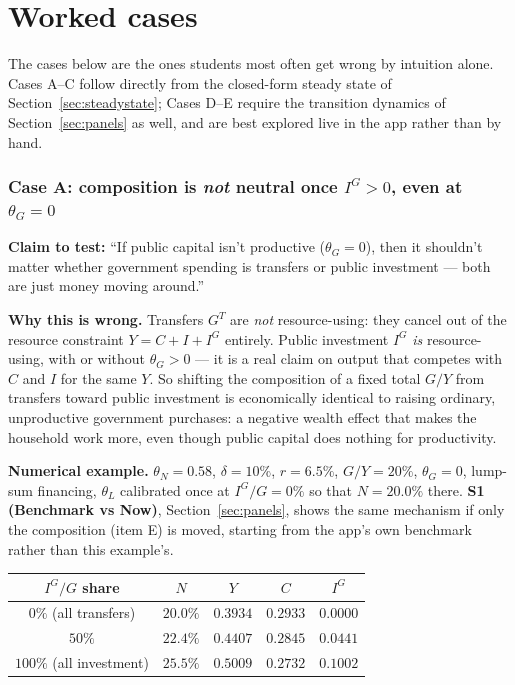 \documentclass[11pt]{article}
\begin{document}
\part{Worked cases}

The cases below are the ones students most often get wrong by intuition
alone. Cases A--C follow directly from the closed-form steady state of
Section~\ref{sec:steadystate}; Cases D--E require the transition dynamics
of Section~\ref{sec:panels} as well, and are best explored live in the
app rather than by hand.

\section{Case A: composition is \emph{not} neutral once $I^G>0$, even at $\theta_G=0$}
\label{sec:caseA}

\textbf{Claim to test:} ``If public capital isn't productive ($\theta_G=0$),
then it shouldn't matter whether government spending is transfers or public
investment --- both are just money moving around.''

\textbf{Why this is wrong.} Transfers $G^T$ are \emph{not} resource-using:
they cancel out of the resource constraint $Y=C+I+I^G$ entirely. Public
investment $I^G$ \emph{is} resource-using, with or without $\theta_G>0$ ---
it is a real claim on output that competes with $C$ and $I$ for the same
$Y$. So shifting the composition of a fixed total $G/Y$ from transfers
toward public investment is economically identical to raising ordinary,
unproductive government purchases: a negative wealth effect that makes the
household work more, even though public capital does nothing for
productivity.

\begin{casebox}
\textbf{Numerical example.} $\theta_N=0.58$, $\delta=10\%$, $r=6.5\%$,
$G/Y=20\%$, $\theta_G=0$, lump-sum financing, $\theta_L$ calibrated once at
$I^G/G=0\%$ so that $N=20.0\%$ there. \textbf{S1 (Benchmark vs Now)}, Section~\ref{sec:panels}, shows the
same mechanism if only the composition (item E) is moved, starting from the
app's own benchmark rather than this example's.

\begin{center}
\begin{tabular}{ccccc}
\toprule
$I^G/G$ share & $N$ & $Y$ & $C$ & $I^G$ \\
\midrule
$0\%$ (all transfers)   & $20.0\%$ & $0.3934$ & $0.2933$ & $0.0000$ \\
$50\%$                  & $22.4\%$ & $0.4407$ & $0.2845$ & $0.0441$ \\
$100\%$ (all investment) & $25.5\%$ & $0.5009$ & $0.2732$ & $0.1002$ \\
\bottomrule
\end{tabular}
\end{center}
\end{casebox}
\end{document}
